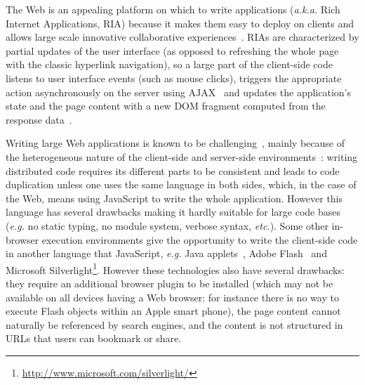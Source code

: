 \documentclass[american,english,runningheads]{llncs}
\newcommand{\eg}{\emph{e.g.}}
\newcommand{\etc}{\emph{etc.}}
\newcommand{\aka}{\emph{a.k.a.}}
\begin{document}
The Web is an appealing platform on which to write applications (\aka{} Rich Internet Applications, RIA) because it
makes them easy to deploy on clients and allows large scale innovative collaborative
experiences~\cite{Farrell07_RIA,Mikkonen08_SpaghettiJs}. RIAs are characterized by partial updates of the user
interface (as opposed to refreshing the whole page with the classic hyperlink navigation), so a large part of the
client-side code listens to user interface events (such as mouse clicks), triggers the appropriate action
asynchronously on the server using AJAX~\cite{Garrett05_Ajax} and updates the application’s state and the page content
with a new DOM fragment computed from the response data~\cite{Farrell07_RIA,Busch09_StateOfArtRIA}.

Writing large Web applications is known to be
challenging~\cite{Mikkonen08_SpaghettiJs,Preciado05_RIAMethodologyNecessity}, mainly because of the heterogeneous
nature of the client-side and server-side environments~\cite{Echeverria09_RIA,Kuuskeri09_PartitioningClientServer}:
writing distributed code requires its different parts to be consistent and leads to code duplication unless one uses
the same language in both sides, which, in the case of the Web, means using JavaScript to write the whole
application. However this language has several drawbacks making it hardly suitable for large code bases (\eg{} no
static typing, no module system, verbose syntax, \etc). Some other in-browser execution environments give the
opportunity to write the client-side code in another language that JavaScript, \eg{} Java
applets~\cite{Anuff96_JavaApplets}, Adobe Flash~\cite{Curtis00_Flash} and Microsoft
Silverlight\footnote{\href{http://www.microsoft.com/silverlight/}{http://www.microsoft.com/silverlight/}}. However
these technologies also have several drawbacks: they require an additional browser plugin to be installed (which may
not be available on all devices having a Web browser: for instance there is no way to execute Flash objects within an
Apple smart phone), the page content cannot naturally be referenced by search engines, and the content is not
structured in URLs that users can bookmark or share.
\end{document}
